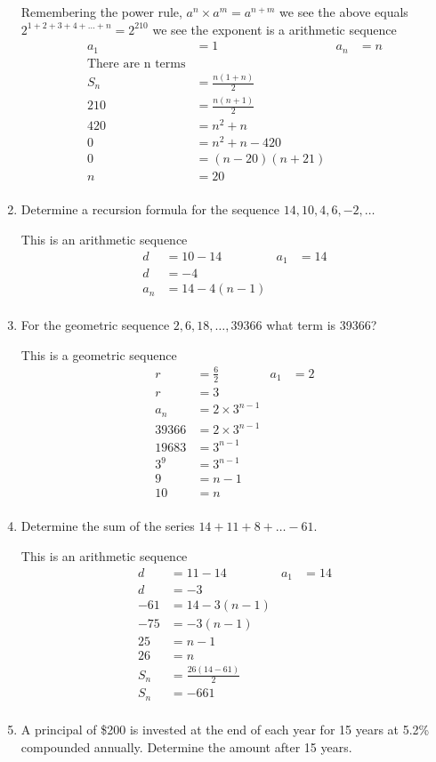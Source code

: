 \documentclass[paper=a4, fontsize=11pt]{scrartcl}
\begin{document}
\begin{enumerate}[resume]
    Remembering the power rule, $a^n\times a^m=a^{n+m}$ we see the above equals $2^{1+2+3+4+\ldots +n}=2^210$ we see the exponent is a arithmetic sequence 
    \begin{align*}
        a_1&=1&a_n&=n\\
        \text{There are n terms}\\
        S_n&=\frac{n(1+n)}{2}\\
        210&=\frac{n(n+1)}{2}\\
        420&=n^2+n\\
        0&=n^2+n-420\\
        0&=(n-20)(n+21)\\
        n&=20\\
    \end{align*}
    \item Determine a recursion formula for the sequence $14,10,4,6,-2,\ldots$
    
    This is an arithmetic sequence
    \begin{align}
        d&=10-14&a_1&=14\\
        d&=-4\\
        a_n&=14-4(n-1)\\
    \end{align}
    \item For the geometric sequence $2,6,18,\ldots,39366$ what term is 39366?
    
    This is a geometric sequence
    \begin{align*}
        r&=\frac{6}{2}&a_1&=2\\
        r&=3\\
        a_n&=2\times 3^{n-1}\\
        39366&=2\times 3^{n-1}\\
        19683&=3^{n-1}\\
        3^9&=3^{n-1}\\
        9&=n-1\\
        10&=n\\
    \end{align*}
    \item Determine the sum of the series $14+11+8+\ldots -61$.
    
    This is an arithmetic sequence
    \begin{align*}
        d&=11-14&a_1&=14\\
        d&=-3\\
        -61&=14-3(n-1)\\
        -75&=-3(n-1)\\
        25&=n-1\\
        26&=n\\
        S_n&=\frac{26(14-61)}{2}\\
        S_n&=-661\\
    \end{align*}
    \item A principal of \$200 is invested at the end of each year for 15 years at 5.2\% compounded annually. Determine the amount after 15 years.
    

\end{enumerate}
\end{document}

